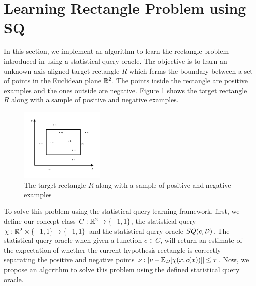 \section{Learning Rectangle Problem using SQ}
\label{sec:implementation}

In this section, we implement an algorithm to learn the rectangle problem introduced in \cite{blumer_learnability_1989} using a statistical query oracle. The objective is to learn an unknown axis-aligned target rectangle $R$ which forms the boundary between a set of points in the Euclidean plane $\mathbb{R}^2$. The points inside the rectangle are positive examples and the ones outside are negative. Figure \ref{fig:rectangle_problem} shows the target rectangle $R$ along with a sample of positive and negative examples.

\begin{figure}
    \centering
    \includegraphics[width=0.36\textwidth]{report/figs/Rectangle.pdf}
    \caption{The target rectangle $R$ along with a sample of positive and negative examples \cite{kearns_introduction_1994}}
    \label{fig:rectangle_problem}
\end{figure}

To solve this problem using the statistical query learning framework, first, we define our concept class $C: \mathbb{R}^2 \xrightarrow{} \{-1, 1\}$, the statistical query $\chi: \mathbb{R}^2 \times \{-1, 1\} \xrightarrow{} \{-1, 1\}$ and the statistical query oracle $SQ(c, \mathcal{D})$. The statistical query oracle when given a function $c \in C$, will return an estimate of the expectation of whether the current hypothesis rectangle is correctly separating the positive and negative points $\nu: |\nu - \mathbb{E}_{\mathcal{D}}[\chi(x, c(x))]| \leq \tau$. Now, we propose an algorithm to solve this problem using the defined statistical query oracle.

